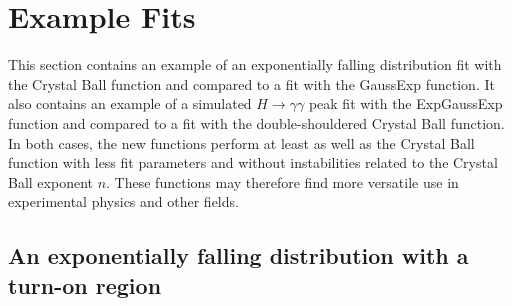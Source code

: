 \documentclass[10pt,letterpaper]{article}
\begin{document}
\section{Example Fits}

This section contains an example of an exponentially falling distribution fit with the Crystal Ball function and compared to a fit with the GaussExp function. It also contains an example of a simulated $H\to\gamma\gamma$ peak fit with the ExpGaussExp function and compared to a fit with the double-shouldered Crystal Ball function. In both cases, the new functions perform at least as well as the Crystal Ball function with less fit parameters and without instabilities related to the Crystal Ball exponent $n$. These functions may therefore find more versatile use in experimental physics and other fields.

\subsection{An exponentially falling distribution with a turn-on region}
\end{document}
